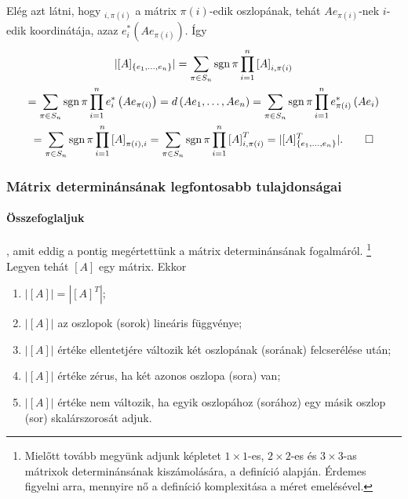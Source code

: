 \documentclass[9pt, a4paper, showtrims]{memoir}
\makeatletter
\renewenvironment{proof}[1][\proofname]
    {\par\pushQED{\qed}%
    \normalfont \topsep6\p@\@plus6\p@\relax
    \trivlist
    \item[\hskip\labelsep
        \itshape
    #1\@addpunct{:}]\ignorespaces}
    {\popQED\endtrivlist\@endpefalse}
\theoremstyle{plain}
\theoremstyle{remark}
\theoremstyle{definition}
\DeclareMathOperator{\sgn}{sgn}
\makeatother
\begin{document}
\begin{proof}
    Elég azt látni, hogy 
    \begin{math}
        [A]_{i,\pi(i)}
    \end{math}
    a mátrix $\pi(i)$-edik oszlopának, tehát $Ae_{\pi(i)}$-nek $i$-edik koordinátája, azaz 
    \begin{math}
        e_i^\ast\left( Ae_{\pi(i)} \right).
    \end{math}
    Így 
    \begin{multline*}
        |[A]_{\left\{e_1,\dots,e_n \right\}}|
        =
        \sum_{\pi \in S_{n}}\sgn\pi\prod_{i=1}^n\left[ A\right]_{i,\pi \left( i\right) }
        \\
        =
        \sum_{\pi \in S_{n}}\sgn\pi\prod_{i=1}^ne_i^\ast\left( Ae_{\pi(i)} \right)
        =
        d\left( Ae_1,\dots,Ae_n \right)
        =
        \sum_{\pi \in S_{n}}\sgn\pi\prod_{i=1}^ne_{\pi(i)}^\ast\left( Ae_i \right)
        \\
        =
        \sum_{\pi \in S_{n}}\sgn\pi\prod_{i=1}^n\left[ A\right]_{\pi \left( i\right),i }
        =
        \sum_{\pi \in S_{n}}\sgn\pi\prod_{i=1}^n\left[ A\right]^T_{i,\pi \left( i\right)}
        =
        |[A]^T_{\left\{e_1,\dots,e_n \right\}}|.\qedhere
    \end{multline*}
\end{proof}

\subsubsection{Mátrix determinánsának legfontosabb tulajdonságai}

\paragraph{Összefoglaljuk}, amit eddig a pontig megértettünk a mátrix determinánsának fogalmáról.
\footnote{
Mielőtt tovább megyünk adjunk képletet $1\times 1$-es, 
$2\times 2$-es és $3\times 3$-as mátrixok determinánsának kiszámolására, a definíció alapján.
Érdemes figyelni arra, mennyire nő a definíció komplexitása a méret emelésével.
}
Legyen tehát $[A]$ egy mátrix. Ekkor
\begin{enumerate}
    \item $|[A]|=|[A]^T|$;
    \item $|[A]|$ az oszlopok (sorok) lineáris függvénye;
    \item $|[A]|$ értéke ellentetjére változik két oszlopának (sorának) felcserélése után;
    \item $|[A]|$ értéke zérus, ha két azonos oszlopa (sora) van;
    \item $|[A]|$ értéke nem változik, ha egyik oszlopához (sorához) egy másik oszlop (sor) skalárszorosát adjuk.
\end{enumerate}
\end{document}
